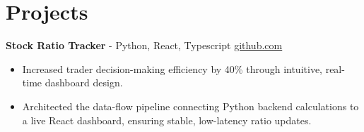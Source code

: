 \documentclass[11pt]{article}       %
\begin{document}

\vspace{-18.5pt}

\section*{Projects}

\textbf{Stock Ratio Tracker}{ - Python, React, Typescript} \hfill \href{https://github.com/Monica20030707/tradingDashboard-UI}{github.com} \\
\vspace{-9pt}
\begin{itemize}
  \item Increased trader decision-making efficiency by 40\% through intuitive, real-time dashboard design.
  \item Architected the data-flow pipeline connecting Python backend calculations to a live React dashboard, ensuring stable, low-latency ratio updates.
\end{itemize}

\end{document}
